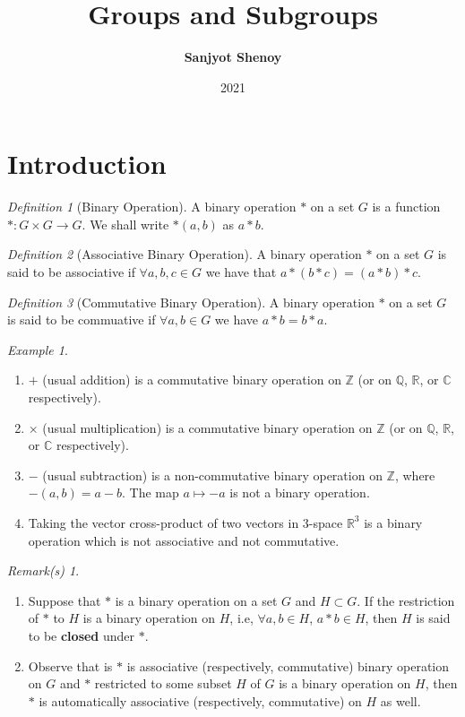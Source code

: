 \documentclass[11pt]{article}
\title{Groups and Subgroups}
\author{\textbf{Sanjyot Shenoy}}
\date{2021}
\theoremstyle{plain}%
\theoremstyle{definition}
\theoremstyle{remark}
\theoremstyle{breakthm}
\theoremstyle{breakdefn}
\newtheorem{defn}{Definition}[section]
\newtheorem{bexmp}{Example}[section]
\theoremstyle{breakrem}
\newtheorem*{rem}{Remark(s)}
\newcommand{\R}{{\mathbb R}}
\newcommand{\Z}{{\mathbb Z}}
\newcommand{\Q}{{\mathbb Q}}
\newcommand{\C}{{\mathbb C}}
\begin{document}
	\maketitle
	\tableofcontents
	\section{Introduction}
	\begin{defn}[Binary Operation]
		A binary operation $*$ on a set $G$ is a function $*:G\times G\to G$. We shall write $*(a,b)$ as $a*b$. 
	\end{defn}
	\begin{defn}[Associative Binary Operation]
		A binary operation $*$ on a set $G$ is said to be associative if $\forall a,b,c\in G$ we have that $a*(b*c)=(a*b)*c$.
	\end{defn}
	\begin{defn}[Commutative Binary Operation]
		A binary operation $*$ on a set $G$ is said to be commuative if $\forall a,b\in G$ we have $a*b=b*a$.
	\end{defn}
	\begin{bexmp}
		\leavevmode \vspace{-\baselineskip}
		\begin{enumerate}
			\item $+$ (usual addition) is a commutative binary operation on $\Z$ (or on $\Q$, $\R$, or $\C$ respectively). 
			\item $\times $ (usual multiplication) is a commutative binary operation on $\Z$ (or on $\Q$, $\R$, or $\C$ respectively).
			\item $-$ (usual subtraction) is a non-commutative binary operation on $\Z$, where $-(a,b)=a-b$. The map $a\mapsto -a$ is not a binary operation.
			\item Taking the  vector cross-product of two vectors in 3-space $\R^3$ is a binary operation which is not associative and not commutative.
		\end{enumerate}
	\end{bexmp}
	\begin{rem}
		\leavevmode \vspace{-\baselineskip}
		\begin{enumerate}
			\item  Suppose that $*$ is a binary operation on a set $G$ and $H\subset G$. If the restriction of $*$ to $H$ is a binary operation on $H$, i.e, $\forall a,b\in H$, $a*b\in H$, then  $H$ is said to be \textbf{closed} under $*$. 
			\item Observe that is $*$ is associative (respectively, commutative) binary operation on $G$ and $*$ restricted to some subset $H$ of $G$ is a binary operation on $H$, then $*$ is automatically associative (respectively, commutative) on $H$ as well. 
		\end{enumerate}
	\end{rem}
\end{document}
